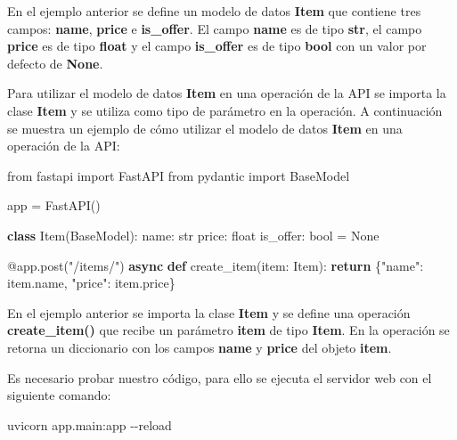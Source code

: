 \documentclass[
  a4paper,
  DIV=11,
  numbers=noendperiod,
  onepage,
  openany]{scrreprt}
\newenvironment{Shaded}{\begin{snugshade}}{\end{snugshade}}
\newcommand{\AttributeTok}[1]{\textcolor[rgb]{0.40,0.45,0.13}{#1}}
\newcommand{\BuiltInTok}[1]{\textcolor[rgb]{0.00,0.23,0.31}{#1}}
\newcommand{\ControlFlowTok}[1]{\textcolor[rgb]{0.00,0.23,0.31}{\textbf{#1}}}
\newcommand{\ExtensionTok}[1]{\textcolor[rgb]{0.00,0.23,0.31}{#1}}
\newcommand{\ImportTok}[1]{\textcolor[rgb]{0.00,0.46,0.62}{#1}}
\newcommand{\KeywordTok}[1]{\textcolor[rgb]{0.00,0.23,0.31}{\textbf{#1}}}
\newcommand{\NormalTok}[1]{\textcolor[rgb]{0.00,0.23,0.31}{#1}}
\newcommand{\OperatorTok}[1]{\textcolor[rgb]{0.37,0.37,0.37}{#1}}
\newcommand{\StringTok}[1]{\textcolor[rgb]{0.13,0.47,0.30}{#1}}
\newcommand{\VariableTok}[1]{\textcolor[rgb]{0.07,0.07,0.07}{#1}}
\begin{document}
En el ejemplo anterior se define un modelo de datos \textbf{Item} que
contiene tres campos: \textbf{name}, \textbf{price} e
\textbf{is\_offer}. El campo \textbf{name} es de tipo \textbf{str}, el
campo \textbf{price} es de tipo \textbf{float} y el campo
\textbf{is\_offer} es de tipo \textbf{bool} con un valor por defecto de
\textbf{None}.

Para utilizar el modelo de datos \textbf{Item} en una operación de la
API se importa la clase \textbf{Item} y se utiliza como tipo de
parámetro en la operación. A continuación se muestra un ejemplo de cómo
utilizar el modelo de datos \textbf{Item} en una operación de la API:

\begin{Shaded}
\begin{Highlighting}[]
\ImportTok{from}\NormalTok{ fastapi }\ImportTok{import}\NormalTok{ FastAPI}
\ImportTok{from}\NormalTok{ pydantic }\ImportTok{import}\NormalTok{ BaseModel}

\NormalTok{app }\OperatorTok{=}\NormalTok{ FastAPI()}

\KeywordTok{class}\NormalTok{ Item(BaseModel):}
\NormalTok{    name: }\BuiltInTok{str}
\NormalTok{    price: }\BuiltInTok{float}
\NormalTok{    is\_offer: }\BuiltInTok{bool} \OperatorTok{=} \VariableTok{None}

\AttributeTok{@app.post}\NormalTok{(}\StringTok{"/items/"}\NormalTok{)}
\ControlFlowTok{async} \KeywordTok{def}\NormalTok{ create\_item(item: Item):}
    \ControlFlowTok{return}\NormalTok{ \{}\StringTok{"name"}\NormalTok{: item.name, }\StringTok{"price"}\NormalTok{: item.price\}}
\end{Highlighting}
\end{Shaded}

En el ejemplo anterior se importa la clase \textbf{Item} y se define una
operación \textbf{create\_item()} que recibe un parámetro \textbf{item}
de tipo \textbf{Item}. En la operación se retorna un diccionario con los
campos \textbf{name} y \textbf{price} del objeto \textbf{item}.

Es necesario probar nuestro código, para ello se ejecuta el servidor web
con el siguiente comando:

\begin{Shaded}
\begin{Highlighting}[]
\ExtensionTok{uvicorn}\NormalTok{ app.main:app }\AttributeTok{{-}{-}reload}
\end{Highlighting}
\end{Shaded}
\end{document}
